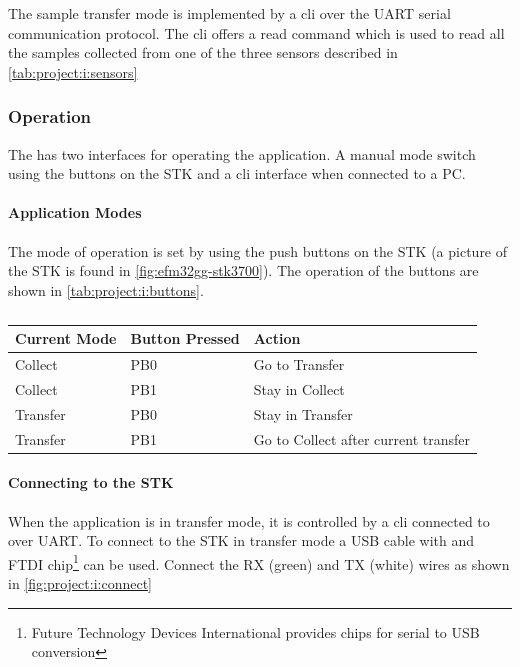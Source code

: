 The sample transfer mode is implemented by a \gls{cli} over the UART serial communication protocol.
The \gls{cli} offers a read command which is used to read all the samples collected from one of the three sensors described in \autoref{tab:project:i:sensors}

\subsubsection{Operation}

The {\tracker} has two interfaces for operating the application.
A manual mode switch using the buttons on the STK and a \gls{cli} interface when connected to a PC.

\paragraph{Application Modes}
The mode of operation is set by using the push buttons on the STK (a picture of the STK is found in \autoref{fig:efm32gg-stk3700}).
The operation of the buttons are shown in \autoref{tab:project:i:buttons}.

\begin{table}[H]
  \centering
  \begin{tabular}{l|l|l}
    \textbf{Current Mode} & \textbf{Button Pressed} & \textbf{Action} \\
    \hline
    Collect & PB0 & Go to Transfer \\
    Collect & PB1 & Stay in Collect \\
    Transfer & PB0 & Stay in Transfer \\
    Transfer & PB1 & Go to Collect after current transfer \\
    \hline
  \end{tabular}
  \caption{}
  \label{tab:project:i:buttons}
\end{table}

\paragraph{Connecting to the STK}
When the application is in transfer mode, it is controlled by a \gls{cli} connected to over UART.
To connect to the STK in transfer mode a USB cable with and FTDI chip\footnote{Future Technology Devices International provides chips for serial to USB conversion} can be used.
Connect the RX (green) and TX (white) wires as shown in \autoref{fig:project:i:connect}

